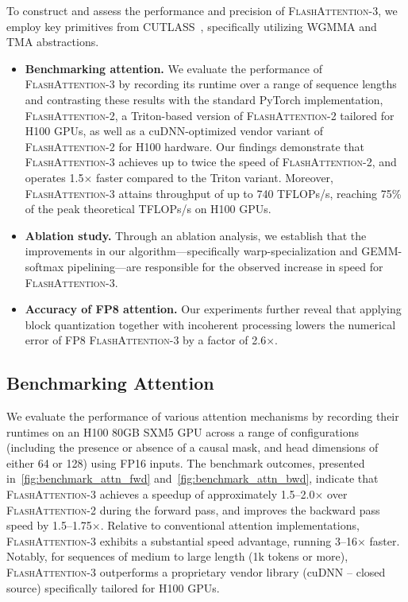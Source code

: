 To construct and assess the performance and precision of \textsc{FlashAttention-3}, we employ key primitives from CUTLASS~\citep{Thakkar_CUTLASS_2023}, specifically utilizing WGMMA and TMA abstractions.

\begin{itemize}

\item \textbf{Benchmarking attention.} We evaluate the performance of \textsc{FlashAttention-3} by recording its runtime over a range of sequence lengths and contrasting these results with the standard PyTorch implementation, \textsc{FlashAttention-2}, a Triton-based version of \textsc{FlashAttention-2} tailored for H100 GPUs, as well as a cuDNN-optimized vendor variant of \textsc{FlashAttention-2} for H100 hardware. Our findings demonstrate that \textsc{FlashAttention-3} achieves up to twice the speed of \textsc{FlashAttention-2}, and operates 1.5$\times$ faster compared to the Triton variant. Moreover, \textsc{FlashAttention-3} attains throughput of up to 740 TFLOPs/s, reaching 75\% of the peak theoretical TFLOPs/s on H100 GPUs.

\item \textbf{Ablation study.} Through an ablation analysis, we establish that the improvements in our algorithm—specifically warp-specialization and GEMM-softmax pipelining—are responsible for the observed increase in speed for \textsc{FlashAttention-3}.

\item \textbf{Accuracy of FP8 attention.} Our experiments further reveal that applying block quantization together with incoherent processing lowers the numerical error of FP8 \textsc{FlashAttention-3} by a factor of 2.6$\times$.
\end{itemize}

\subsection{Benchmarking Attention}
\label{subsec:benchmark_attn}

We evaluate the performance of various attention mechanisms by recording their runtimes on an H100 80GB SXM5 GPU across a range of configurations (including the presence or absence of a causal mask, and head dimensions of either 64 or 128) using FP16 inputs. The benchmark outcomes, presented in~\cref{fig:benchmark_attn_fwd} and~\cref{fig:benchmark_attn_bwd}, indicate that \textsc{FlashAttention-3} achieves a speedup of approximately 1.5--2.0$\times$ over \textsc{FlashAttention-2} during the forward pass, and improves the backward pass speed by 1.5--1.75$\times$. Relative to conventional attention implementations, \textsc{FlashAttention-3} exhibits a substantial speed advantage, running 3--16$\times$ faster. Notably, for sequences of medium to large length (1k tokens or more), \textsc{FlashAttention-3} outperforms a proprietary vendor library (cuDNN -- closed source) specifically tailored for H100 GPUs.

